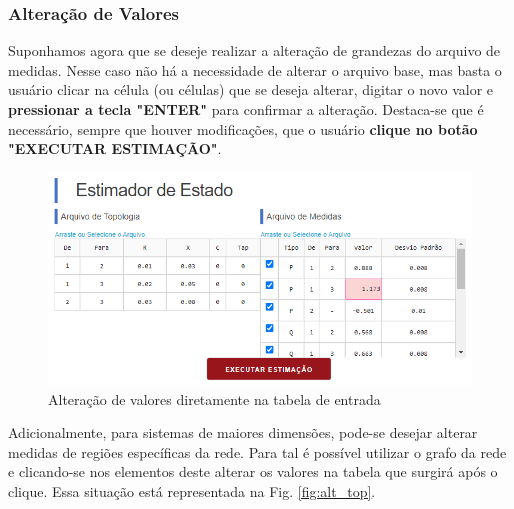 \documentclass{article}
\begin{document}
\subsubsection{Alteração de Valores}
Suponhamos agora que se deseje realizar a alteração de grandezas do arquivo de medidas. Nesse caso não há a necessidade de alterar o arquivo base, mas basta o usuário clicar na célula (ou células) que se deseja alterar, digitar o novo valor e \textbf{pressionar a tecla "ENTER"} para confirmar a alteração. Destaca-se que é necessário, sempre que houver modificações, que o usuário \textbf{clique no botão "EXECUTAR ESTIMAÇÃO"}.



\begin{figure}[H]
    \centering
    \includegraphics[scale=.70]{Imagens/Alteração_de_valor.PNG}
    \caption{Alteração de valores diretamente na tabela de entrada}
    \label{fig:alt_vaç}
\end{figure}

Adicionalmente, para sistemas de maiores dimensões, pode-se desejar alterar medidas de regiões específicas da rede. Para tal é possível utilizar o grafo da rede e clicando-se nos elementos deste alterar os valores na tabela que surgirá após o clique. Essa situação está representada na Fig. \ref{fig:alt_top}. 
\end{document}
